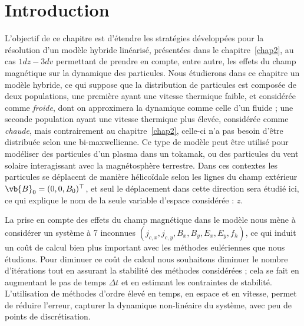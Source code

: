 
\section{Introduction}

L'objectif de ce chapitre est d'étendre les stratégies développées pour la résolution d'un modèle hybride linéarisé, présentées dans le chapitre~\ref{chap2}, au cas $1dz-3dv$ permettant de prendre en compte, entre autre, les effets du champ magnétique sur la dynamique des particules. Nous étudierons dans ce chapitre un modèle hybride, ce qui suppose que la distribution de particules est composée de deux populations, une première ayant une vitesse thermique faible, et considérée comme \emph{froide}, dont on approximera la dynamique comme celle d'un fluide ; une seconde population ayant une vitesse thermique plus élevée, considérée comme \emph{chaude}, mais contrairement au chapitre~\ref{chap2}, celle-ci n'a pas besoin d'être distribuée selon une bi-maxwellienne. Ce type de modèle peut être utilisé pour modéliser des particules d'un plasma dans un tokamak, ou des particules du vent solaire interagissant avec la magnétosphère terrestre. Dans ces contextes les particules se déplacent de manière hélicoïdale selon les lignes du champ extérieur $\vb{B}_0 = (0,0,B_0)^\top$, et seul le déplacement dans cette direction sera étudié ici, ce qui explique le nom de la seule variable d'espace considérée : $z$.

La prise en compte des effets du champ magnétique dans le modèle nous mène à considérer un système à 7 inconnues $(j_{c,x},j_{c,y},B_x,B_y,E_x,E_y,f_h)$, ce qui induit un coût de calcul bien plus important avec les méthodes eulériennes que nous étudions. Pour diminuer ce coût de calcul nous souhaitons diminuer le nombre d'itérations tout en assurant la stabilité des méthodes considérées ; cela se fait en augmentant le pas de temps $\Delta t$ et en estimant les contraintes de stabilité. L'utilisation de méthodes d'ordre élevé en temps, en espace et en vitesse, permet de réduire l'erreur, capturer la dynamique non-linéaire du système, avec peu de points de discrétisation.

